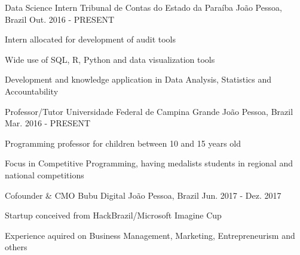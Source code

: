 

\begin{cventries}
  \cventry
    {Data Science Intern} %
    {Tribunal de Contas do Estado da Paraíba} %
    {João Pessoa, Brazil} %
    {Out. 2016 - PRESENT} %
    {
      \begin{cvitems} %
        \item {Intern allocated for development of audit tools}
        \item {Wide use of SQL, R, Python and data visualization tools}
        \item {Development and knowledge application in Data Analysis, Statistics and Accountability}
      \end{cvitems}
    }

  \cventry
    {Professor/Tutor} %
    {Universidade Federal de Campina Grande} %
    {João Pessoa, Brazil} %
    {Mar. 2016 - PRESENT} %
    {
      \begin{cvitems} %
        \item {Programming professor for children between 10 and 15 years old}
        \item {Focus in Competitive Programming, having medalists students in regional and national competitions}
      \end{cvitems}
    }

      \cventry
        {Cofounder \& CMO} %
        {Bubu Digital} %
        {João Pessoa, Brazil} %
        {Jun. 2017 - Dez. 2017} %
        {
          \begin{cvitems} %
            \item {Startup conceived from HackBrazil/Microsoft Imagine Cup}
            \item {Experience aquired on Business Management, Marketing, Entrepreneurism and others}
          \end{cvitems}
        }


\end{cventries}
